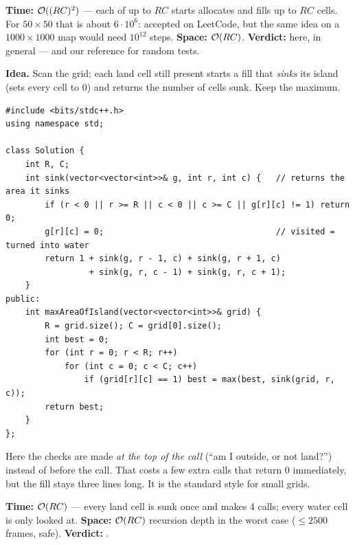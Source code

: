 \begin{bruteforcebox}
\begin{complexitybox}
\textbf{Time:} $\mathcal{O}((RC)^2)$ --- each of up to $RC$ starts allocates and fills up to $RC$ cells. For $50\times50$ that is about $6\cdot10^6$: accepted on LeetCode, but the same idea on a $1000\times1000$ map would need $10^{12}$ steps. \textbf{Space:} $\mathcal{O}(RC)$. \textbf{Verdict:} \ac{} here, \tle{} in general --- and our reference for random tests.
\end{complexitybox}
\end{bruteforcebox}

\begin{algorithmbox}
\textbf{Idea.} Scan the grid; each land cell still present starts a fill that \emph{sinks} its island (sets every cell to $0$) and returns the number of cells sunk. Keep the maximum.

\begin{lstlisting}[style=cpp]
#include <bits/stdc++.h>
using namespace std;

class Solution {
    int R, C;
    int sink(vector<vector<int>>& g, int r, int c) {   // returns the area it sinks
        if (r < 0 || r >= R || c < 0 || c >= C || g[r][c] != 1) return 0;
        g[r][c] = 0;                                   // visited = turned into water
        return 1 + sink(g, r - 1, c) + sink(g, r + 1, c)
                 + sink(g, r, c - 1) + sink(g, r, c + 1);
    }
public:
    int maxAreaOfIsland(vector<vector<int>>& grid) {
        R = grid.size(); C = grid[0].size();
        int best = 0;
        for (int r = 0; r < R; r++)
            for (int c = 0; c < C; c++)
                if (grid[r][c] == 1) best = max(best, sink(grid, r, c));
        return best;
    }
};
\end{lstlisting}

Here the checks are made \emph{at the top of the call} (``am I outside, or not land?'') instead of before the call. That costs a few extra calls that return 0 immediately, but the fill stays three lines long. It is the standard style for small grids.

\begin{complexitybox}
\textbf{Time:} $\mathcal{O}(RC)$ --- every land cell is sunk once and makes 4 calls; every water cell is only looked at. \textbf{Space:} $\mathcal{O}(RC)$ recursion depth in the worst case ($\le 2500$ frames, safe). \textbf{Verdict:} \ac{}.
\end{complexitybox}
\end{algorithmbox}

